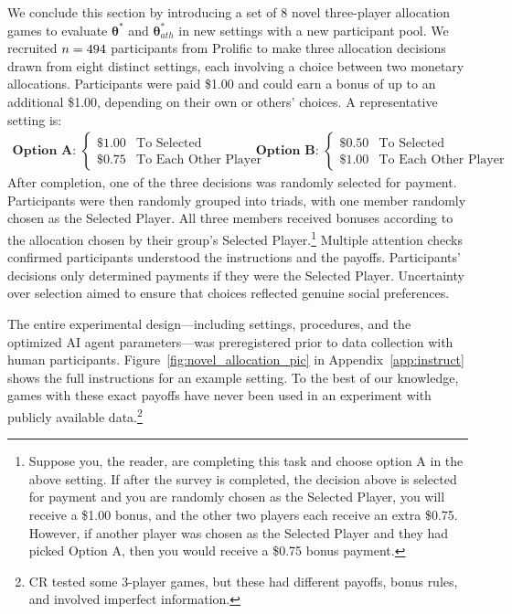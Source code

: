 \documentclass[11pt]{article}
\theoremstyle{definition}
\newcommand{\aisub}{AI agent}
\begin{document}
We conclude this section by introducing a set of 8 novel three-player allocation games to evaluate $\bm{\theta}^*$ and $\bm{\theta}_{ath}^*$ in new settings with a new participant pool.
We recruited $n = 494$ participants from Prolific to make three allocation decisions drawn from eight distinct settings, each involving a choice between two monetary allocations.
Participants were paid \$1.00 and could earn a bonus of up to an additional \$1.00, depending on their own or others' choices. 
A representative setting is:
$$
\begin{array}{cc}
\mathbf{\textbf{Option A: }} \begin{cases}
\$1.00 & \text{To Selected} \\
\$0.75 & \text{To Each Other Player}
\end{cases}
&
\quad\quad
\mathbf{\textbf{Option B: }} \begin{cases}
\$0.50 & \text{To Selected} \\
\$1.00 & \text{To Each Other Player}
\end{cases}
\end{array}
$$
After completion, one of the three decisions was randomly selected for payment. 
Participants were then randomly grouped into triads, with one member randomly chosen as the Selected Player. 
All three members received bonuses according to the allocation chosen by their group's Selected Player.\footnote{Suppose you, the reader, are completing this task and choose option A in the above setting.
If after the survey is completed, the decision above is selected for payment and you are randomly chosen as the Selected Player, you will receive a \$1.00 bonus, and the other two players each receive an extra \$0.75.
However, if another player was chosen as the Selected Player and they had picked Option A, then you would receive a \$0.75 bonus payment.}
Multiple attention checks confirmed participants understood the instructions and the payoffs.
Participants' decisions only determined payments if they were the Selected Player.
Uncertainty over selection aimed to ensure that choices reflected genuine social preferences.

The entire experimental design---including settings, procedures, and the optimized \aisub{} parameters---was preregistered prior to data collection with human participants.
Figure~\ref{fig:novel_allocation_pic} in Appendix~\ref{app:instruct} shows the full instructions for an example setting.
To the best of our knowledge, games with these exact payoffs have never been used in an experiment with publicly available data.\footnote{CR tested some 3-player games, but these had different payoffs, bonus rules, and involved imperfect information.}
\end{document}
